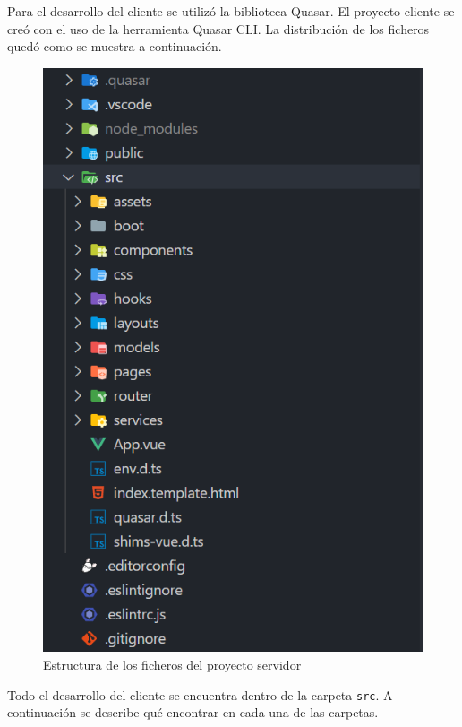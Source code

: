 Para el desarrollo del cliente se utilizó la biblioteca Quasar. El proyecto 
cliente se creó con el uso de la herramienta Quasar CLI. 
La distribución de los ficheros quedó como se muestra a continuación.

\begin{figure}[H]
    \centering
    \includegraphics[scale=0.65]{Graphics/Extensibility/client-structure.png}
    \caption{Estructura de los ficheros del proyecto servidor}
    \label{img-client-structure}
\end{figure}

Todo el desarrollo del cliente se encuentra dentro de la carpeta \texttt{src}.
A continuación se describe qué encontrar en cada una de las carpetas.

